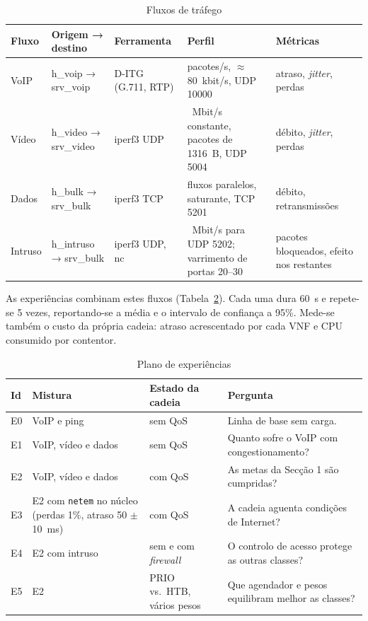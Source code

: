 \documentclass[11pt, a4paper]{article}
\begin{document}
\begin{table}[H]
\centering
\footnotesize
\caption{Fluxos de tráfego}
\label{tab:fluxos}
\begin{tabular}{@{} >{\raggedright\arraybackslash}p{1.5cm} >{\raggedright\arraybackslash}p{2.9cm} >{\raggedright\arraybackslash}p{2.2cm} >{\raggedright\arraybackslash}p{4.0cm} >{\raggedright\arraybackslash}p{3.0cm} @{}}
\toprule
\textbf{Fluxo} & \textbf{Origem → destino} & \textbf{Ferramenta} & \textbf{Perfil} & \textbf{Métricas} \\
\midrule
VoIP & h\_voip → srv\_voip & D-ITG (G.711, RTP) & 50 pacotes/s, $\approx$80~kbit/s, UDP 10000 & atraso, \textit{jitter}, perdas \\
Vídeo & h\_video → srv\_video & iperf3 UDP & 4~Mbit/s constante, pacotes de 1316~B, UDP 5004 & débito, \textit{jitter}, perdas \\
Dados & h\_bulk → srv\_bulk & iperf3 TCP & 4 fluxos paralelos, saturante, TCP 5201 & débito, retransmissões \\
Intruso & h\_intruso → srv\_bulk & iperf3 UDP, nc & 20~Mbit/s para UDP 5202; varrimento de portas 20--30 & pacotes bloqueados, efeito nos restantes \\
\bottomrule
\end{tabular}
\end{table}

As experiências combinam estes fluxos (Tabela~\ref{tab:experiencias}). Cada uma dura 60~s e repete-se 5 vezes, reportando-se a média e o intervalo de confiança a 95\%. Mede-se também o custo da própria cadeia: atraso acrescentado por cada VNF e CPU consumido por contentor.

\begin{table}[H]
\centering
\footnotesize
\caption{Plano de experiências}
\label{tab:experiencias}
\begin{tabular}{@{} >{\raggedright\arraybackslash}p{0.7cm} >{\raggedright\arraybackslash}p{4.4cm} >{\raggedright\arraybackslash}p{3.0cm} >{\raggedright\arraybackslash}p{5.5cm} @{}}
\toprule
\textbf{Id} & \textbf{Mistura} & \textbf{Estado da cadeia} & \textbf{Pergunta} \\
\midrule
E0 & VoIP e ping & sem QoS & Linha de base sem carga. \\
E1 & VoIP, vídeo e dados & sem QoS & Quanto sofre o VoIP com congestionamento? \\
E2 & VoIP, vídeo e dados & com QoS & As metas da Secção 1 são cumpridas? \\
E3 & E2 com \texttt{netem} no núcleo (perdas 1\%, atraso 50 $\pm$ 10~ms) & com QoS & A cadeia aguenta condições de Internet? \\
E4 & E2 com intruso & sem e com \textit{firewall} & O controlo de acesso protege as outras classes? \\
E5 & E2 & PRIO vs.\ HTB, vários pesos & Que agendador e pesos equilibram melhor as classes? \\
\bottomrule
\end{tabular}
\end{table}
\end{document}
